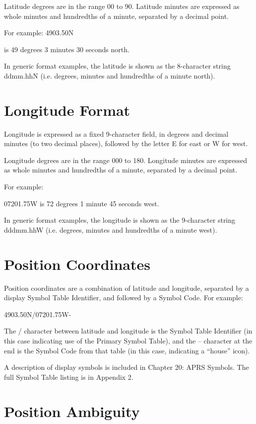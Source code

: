 Latitude degrees are in the range 00 to 90. Latitude minutes are expressed as
whole minutes and hundredths of a minute, separated by a decimal point.

For example:
4903.50N

is 49 degrees 3 minutes 30 seconds north.

In generic format examples, the latitude is shown as the 8-character string
ddmm.hhN (i.e. degrees, minutes and hundredths of a minute north).

\section{Longitude Format}

Longitude is expressed as a fixed 9-character field, in degrees and decimal
minutes (to two decimal places), followed by the letter E for east or W for
west.


Longitude degrees are in the range 000 to 180. Longitude minutes are
expressed as whole minutes and hundredths of a minute, separated by a
decimal point.

For example:

07201.75W is 72 degrees 1 minute 45 seconds west.

In generic format examples, the longitude is shown as the 9-character string
dddmm.hhW (i.e. degrees, minutes and hundredths of a minute west).

\section{Position Coordinates}

Position coordinates are a combination of latitude and longitude, separated
by a display Symbol Table Identifier, and followed by a Symbol Code. For
example:

4903.50N/07201.75W-

The / character between latitude and longitude is the Symbol Table
Identifier (in this case indicating use of the Primary Symbol Table), and the –
character at the end is the Symbol Code from that table (in this case,
indicating a “house” icon).

A description of display symbols is included in Chapter 20: APRS Symbols.
The full Symbol Table listing is in Appendix 2.

\section{Position Ambiguity}

